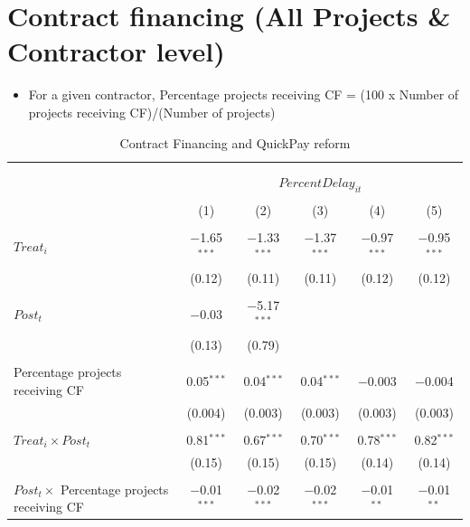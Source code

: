 \documentclass[
]{article}
\providecommand{\tightlist}{%
  \setlength{\itemsep}{0pt}\setlength{\parskip}{0pt}}
\begin{document}
\hypertarget{contract-financing-all-projects-contractor-level}{%
\section{Contract financing (All Projects \& Contractor
level)}\label{contract-financing-all-projects-contractor-level}}

\begin{itemize}
\tightlist
\item
  For a given contractor, Percentage projects receiving CF = (100 x
  Number of projects receiving CF)/(Number of projects)
\end{itemize}

\begin{table}[H] \centering 
  \caption{Contract Financing and QuickPay reform} 
  \label{} 
\small 
\begin{tabular}{@{\extracolsep{-2pt}}lccccc} 
\\[-1.8ex]\hline 
\hline \\[-1.8ex] 
\\[-1.8ex] & \multicolumn{5}{c}{$PercentDelay_{it}$  } \\ 
\\[-1.8ex] & (1) & (2) & (3) & (4) & (5)\\ 
\hline \\[-1.8ex] 
 $Treat_i$ & $-$1.65$^{***}$ & $-$1.33$^{***}$ & $-$1.37$^{***}$ & $-$0.97$^{***}$ & $-$0.95$^{***}$ \\ 
  & (0.12) & (0.11) & (0.11) & (0.12) & (0.12) \\ 
  & & & & & \\ 
 $Post_t$ & $-$0.03 & $-$5.17$^{***}$ &  &  &  \\ 
  & (0.13) & (0.79) &  &  &  \\ 
  & & & & & \\ 
 Percentage projects receiving CF & 0.05$^{***}$ & 0.04$^{***}$ & 0.04$^{***}$ & $-$0.003 & $-$0.004 \\ 
  & (0.004) & (0.003) & (0.003) & (0.003) & (0.003) \\ 
  & & & & & \\ 
 $Treat_i \times Post_t$ & 0.81$^{***}$ & 0.67$^{***}$ & 0.70$^{***}$ & 0.78$^{***}$ & 0.82$^{***}$ \\ 
  & (0.15) & (0.15) & (0.15) & (0.14) & (0.14) \\ 
  & & & & & \\ 
 $Post_t \times$ Percentage projects receiving CF & $-$0.01$^{***}$ & $-$0.02$^{***}$ & $-$0.02$^{***}$ & $-$0.01$^{**}$ & $-$0.01$^{**}$ \\ 

\end{tabular}
\end{table}
\end{document}
